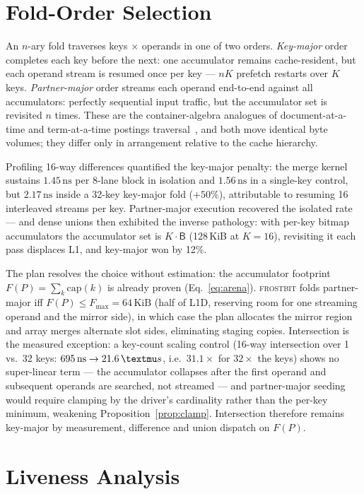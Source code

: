 \documentclass[sigconf,nonacm]{acmart}
\newcommand{\fb}{\textsc{frostbit}}
\newcommand{\us}{\,\textmu s}
\newcommand{\nsu}{\,\text{ns}}
\newcommand{\B}{\ensuremath{\mathsf{B}}}
\newcommand{\capm}{\ensuremath{\mathrm{cap}}}
\begin{document}
\section{Fold-Order Selection}
\label{sec:foldorder}

An $n$-ary fold traverses keys $\times$ operands in one of two orders.
\emph{Key-major} order completes each key before the next: one
accumulator remains cache-resident, but each operand stream is resumed
once per key --- $nK$ prefetch restarts over $K$ keys. \emph{Partner-major}
order streams each operand end-to-end against all accumulators:
perfectly sequential input traffic, but the accumulator set is revisited
$n$ times. These are the container-algebra analogues of
document-at-a-time and term-at-a-time postings
traversal~\cite{turtle1995}, and both move identical byte volumes; they
differ only in arrangement relative to the cache hierarchy.

Profiling 16-way differences quantified the key-major penalty: the merge
kernel sustains $1.45\nsu$ per 8-lane block in isolation and $1.56\nsu$
in a single-key control, but $2.17\nsu$ inside a 32-key key-major fold
($+50\%$), attributable to resuming 16 interleaved streams per key.
Partner-major execution recovered the isolated rate --- and dense unions
then exhibited the inverse pathology: with per-key bitmap accumulators
the accumulator set is $K \cdot \B$ (128\,KiB at $K{=}16$), revisiting
it each pass displaces L1, and key-major won by 12\%.

The plan resolves the choice without estimation: the accumulator
footprint $F(P) = \sum_k \capm(k)$ is already proven
(Eq.~\ref{eq:arena}). \fb{} folds partner-major iff
$F(P) \le F_{\max} = 64\,\text{KiB}$ (half of L1D, reserving room for
one streaming operand and the mirror side), in which case the plan
allocates the mirror region and array merges alternate slot sides,
eliminating staging copies. Intersection is the measured exception: a
key-count scaling control (16-way intersection over 1 vs.\ 32 keys:
$695\nsu \to 21.6\us$, i.e.\ $31.1\times$ for $32\times$ the keys) shows
no super-linear term --- the accumulator collapses after the first
operand and subsequent operands are searched, not streamed --- and
partner-major seeding would require clamping by the driver's cardinality
rather than the per-key minimum, weakening
Proposition~\ref{prop:clamp}. Intersection therefore remains key-major
by measurement, difference and union dispatch on $F(P)$.

\section{Liveness Analysis}
\label{sec:shortcircuit}
\end{document}
